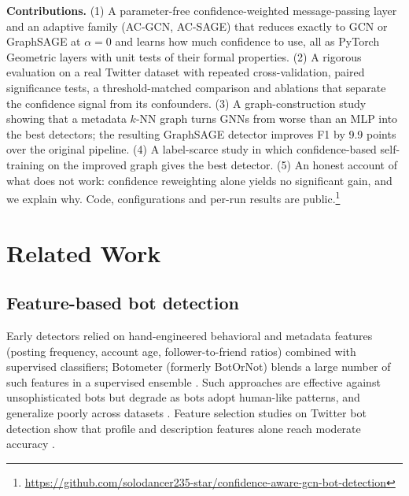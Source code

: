 \documentclass[conference]{IEEEtran}
\begin{document}
\textbf{Contributions.} (1) A parameter-free confidence-weighted message-passing layer and an adaptive family (AC-GCN, AC-SAGE) that reduces exactly to GCN or GraphSAGE at $\alpha=0$ and learns how much confidence to use, all as PyTorch Geometric layers with unit tests of their formal properties. (2) A rigorous evaluation on a real Twitter dataset with repeated cross-validation, paired significance tests, a threshold-matched comparison and ablations that separate the confidence signal from its confounders. (3) A graph-construction study showing that a metadata $k$-NN graph turns GNNs from worse than an MLP into the best detectors; the resulting GraphSAGE detector improves F1 by 9.9 points over the original pipeline. (4) A label-scarce study in which confidence-based self-training on the improved graph gives the best detector. (5) An honest account of what does not work: confidence reweighting alone yields no significant gain, and we explain why. Code, configurations and per-run results are public.\footnote{\url{https://github.com/solodancer235-star/confidence-aware-gcn-bot-detection}}

\section{Related Work}

\begin{table}[t]
\caption{Positioning relative to related aggregation schemes}
\label{tab:positioning}
\centering
{}
\end{table}

\subsection{Feature-based bot detection}
Early detectors relied on hand-engineered behavioral and metadata features (posting frequency, account age, follower-to-friend ratios) combined with supervised classifiers; Botometer (formerly BotOrNot) blends a large number of such features in a supervised ensemble \cite{davis2016botornot}. Such approaches are effective against unsophisticated bots but degrade as bots adopt human-like patterns, and generalize poorly across datasets \cite{yang2020scalable,cresci2020decade}. Feature selection studies on Twitter bot detection show that profile and description features alone reach moderate accuracy \cite{lee2021discriminative}.
\end{document}
